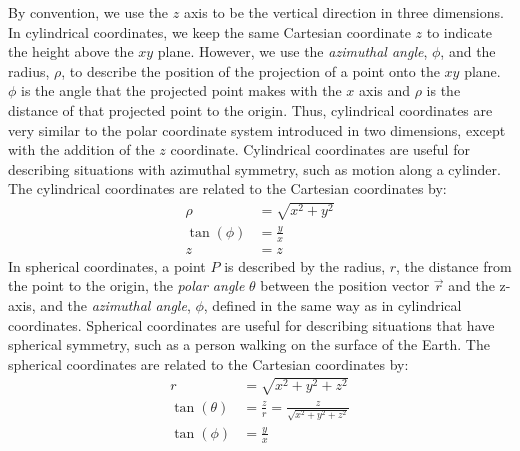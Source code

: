 By convention, we use the $z$ axis to be the vertical direction in three dimensions. In cylindrical coordinates, we keep the same Cartesian coordinate $z$ to indicate the height above the $xy$ plane. However, we use the \textit{azimuthal angle}, $\phi$, and the radius, $\rho$, to describe the position of the projection of a point onto the $xy$ plane. $\phi$ is the angle that the projected point makes with the $x$ axis and $\rho$ is the distance of that projected point to the origin. Thus, cylindrical coordinates are very similar to the polar coordinate system introduced in two dimensions, except with the addition of the $z$ coordinate. Cylindrical coordinates are useful for describing situations with azimuthal symmetry, such as motion along a cylinder. The cylindrical coordinates are related to the Cartesian coordinates by:
\begin{align*}
\rho &= \sqrt{x^2+y^2}\\
\tan(\phi) &= \frac{y}{x}\\
z&=z
\end{align*}
In spherical coordinates, a point $P$ is described by the radius, $r$, the distance from the point to the origin, the \textit{polar angle} $\theta$ between the position vector $\vec r$ and the z-axis, and the \textit{azimuthal angle}, $\phi$, defined in the same way as in cylindrical coordinates. Spherical coordinates are useful for describing situations that have spherical symmetry, such as a person walking on the surface of the Earth. The spherical coordinates are related to the Cartesian coordinates by:
\begin{align*}
r &= \sqrt{x^2+y^2+z^2}\\
\tan(\theta) &= \frac{z}{r}=\frac{z}{\sqrt{x^2+y^2+z^2}}\\
\tan(\phi) &= \frac{y}{x}\\
\end{align*}
